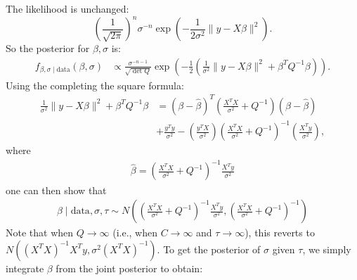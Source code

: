 \documentclass{scrartcl}
\begin{document}
The likelihood is unchanged: 
\begin{equation*}
  \left(\frac{1}{\sqrt{2 \pi}} \right)^n \sigma^{-n} \exp
  \left(-\frac{1}{2 \sigma^2} \|y - X \beta\|^2 \right). 
\end{equation*}
So the posterior for $\beta, \sigma$ is: 
\begin{align*}
  f_{\beta,\sigma \mid \text{data}}(\beta, \sigma)
 & \propto \frac{\sigma^{-n-1}}{\sqrt{\det Q}} \exp
   \left(-\frac{1}{2} \left(\frac{1}{\sigma^2} \|y - X \beta\|^2 +
   \beta^T Q^{-1} \beta \right) \right). 
\end{align*}
Using the completing the square formula: 
\begin{align*}
  \frac{1}{\sigma^2} \|y - X \beta\|^2 +
   \beta^T Q^{-1} \beta &= \left( \beta - \hat{\beta}\right)^T
                          \left(\frac{X^T X}{\sigma^2} + Q^{-1}
                          \right) \left(\beta - \hat{\beta} \right) \\
  &+ \frac{y^T y}{\sigma^2} - \left(\frac{y^T X}{\sigma^2} \right)
    \left(\frac{X^T X}{\sigma^2} + Q^{-1} \right)^{-1} \left(\frac{X^T
    y}{\sigma^2} \right), 
\end{align*}
where
\begin{align*}
  \hat{\beta} = \left(\frac{X^T X}{\sigma^2} + Q^{-1} \right)^{-1}
  \frac{X^T y}{\sigma^2}
\end{align*}
one can then show that
\begin{align}\label{postQ}
  \beta \mid \text{data}, \sigma, \tau \sim N\left( \left(\frac{X^T
                          X}{\sigma^2} + Q^{-1}  \right)^{-1} \frac{X^T y}{\sigma^2}, \left(\frac{X^T 
  X}{\sigma^2} + 
   Q^{-1} \right)^{-1} \right)  
\end{align}
Note that when $Q \rightarrow \infty$ (i.e., when $C \rightarrow
\infty$ and $\tau \rightarrow \infty$), this reverts to$N((X^T
X)^{-1} X^T y, \sigma^2 (X^T X)^{-1})$. To get the posterior of
$\sigma$ given $\tau$, we simply integrate $\beta$ from the joint
posterior to obtain: 
\end{document}
